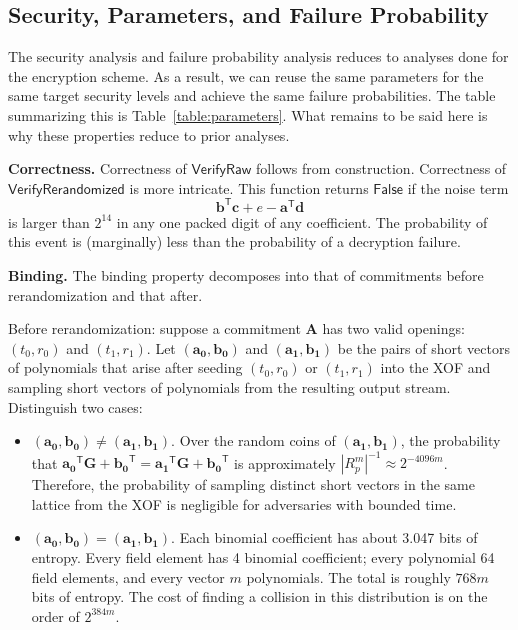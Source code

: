 \subsection{Security, Parameters, and Failure Probability}

The security analysis and failure probability analysis reduces to analyses done for the encryption scheme. As a result, we can reuse the same parameters for the same target security levels and achieve the same failure probabilities. The table summarizing this is Table~\ref{table:parameters}. What remains to be said here is why these properties reduce to prior analyses.

\textbf{Correctness.} Correctness of $\mathsf{VerifyRaw}$ follows from construction. Correctness of $\mathsf{VerifyRerandomized}$ is more intricate. This function returns $\mathsf{False}$ if the noise term
\begin{equation*}
\mathbf{b}^\mathsf{T} \mathbf{c} + e  - \mathbf{a}^\mathsf{T} \mathbf{d}
\end{equation*}
is larger than $2^{14}$ in any one packed digit of any coefficient. The probability of this event is (marginally) less than the probability of a decryption failure.

\textbf{Binding.} The binding property decomposes into that of commitments before rerandomization and that after.

Before rerandomization: suppose a commitment $\mathbf{A}$ has two valid openings: $(t_0, r_0)$ and $(t_1, r_1)$. Let $(\mathbf{a_0}, \mathbf{b_0})$ and $(\mathbf{a_1}, \mathbf{b_1})$ be the pairs of short vectors of polynomials that arise after seeding $(t_0, r_0)$ or $(t_1, r_1)$ into the XOF and sampling short vectors of polynomials from the resulting output stream. Distinguish two cases:
\begin{itemize}
 \item $(\mathbf{a_0}, \mathbf{b_0}) \neq (\mathbf{a_1}, \mathbf{b_1})$. Over the random coins of $(\mathbf{a_1}, \mathbf{b_1})$, the probability that $\mathbf{a_0}^\mathsf{T} \mathbf{G} + \mathbf{b_0}^\mathsf{T} = \mathbf{a_1}^\mathsf{T} \mathbf{G} + \mathbf{b_0}^\mathsf{T}$ is approximately $|R_p^m|^{-1} \approx 2^{-4096m}$. Therefore, the probability of sampling distinct short vectors in the same lattice from the XOF is negligible for adversaries with bounded time.
 \item $(\mathbf{a_0}, \mathbf{b_0}) = (\mathbf{a_1}, \mathbf{b_1})$. Each binomial coefficient has about 3.047 bits of entropy. Every field element has 4 binomial coefficient; every polynomial 64 field elements, and every vector $m$ polynomials. The total is roughly $768 m$ bits of entropy. The cost of finding a collision in this distribution is on the order of $2^{384 m}$.
\end{itemize}

